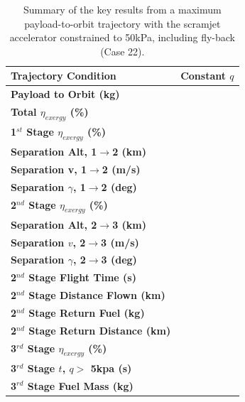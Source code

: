 \begin{table}[!h]
	\centering
\begin{tabular}{l c } 
	\hline \textbf{Trajectory Condition}
	& Constant $q$
	\\
	\hline \textbf{Payload to Orbit (kg)}
	& \textbf{\PayloadToOrbitConstqReturn}
	\\
	\textbf{Total $\eta_{exergy}$ (\%)}
	& \textbf{\totalExergyEffConstqReturn}
	\\
	\hline 
	\textbf{1$^{st}$ Stage $\eta_{exergy}$ (\%)}
	& \textbf{\firstExergyEffConstqReturn}
	\\
	\textbf{Separation Alt, 1$\rightarrow$2 (km)}
	& \firstsecondSeparationAltConstqReturn
	\\
	\textbf{Separation v, 1$\rightarrow$2 (m/s)}
	& \firstsecondSeparationvConstqReturn
	\\
	\textbf{Separation $\gamma$, 1$\rightarrow$2 (deg)}
	& \firstsecondSeparationgammaConstqReturn
	\\
	\hline 
	\textbf{2$^{nd}$ Stage $\eta_{exergy}$ (\%)}
	& \textbf{\secondExergyEffConstqReturn}
	\\
	\textbf{Separation Alt, 2$\rightarrow$3 (km)}
	& \secondthirdSeparationAltConstqReturn
	\\
	\textbf{Separation $v$, 2$\rightarrow$3 (m/s)}
	& \secondthirdSeparationvConstqReturn
	\\
	\textbf{Separation $\gamma$, 2$\rightarrow$3 (deg)}
	& \secondthirdSeparationgammaConstqReturn
	\\
	\textbf{2$^{nd}$ Stage Flight Time (s)}
	& \secondFlightTimeConstqReturn
	\\
	\textbf{2$^{nd}$ Stage Distance Flown (km)}
	& \SecondDistConstqReturn
	\\
	\textbf{2$^{nd}$ Stage Return Fuel (kg)}
	& \returnFuelConstqReturn
	\\
	\textbf{2$^{nd}$ Stage Return Distance (km)}
	& \returnDistConstqReturn
	\\
	\hline 
	\textbf{3$^{rd}$ Stage $\eta_{exergy}$ (\%)}
	& \textbf{\thirddExergyEffConstqReturn}
	\\
	\textbf{3$^{rd}$ Stage $t$, $q >$ 5kpa (s)}
	& \thirdqOverFiveConstqReturn
	\\
	\textbf{3$^{rd}$ Stage Fuel Mass (kg)}
	& \thirdmFuelConstqReturn
	\\
	\hline 
\end{tabular} 
\caption{Summary of the key results from a maximum payload-to-orbit trajectory with the scramjet accelerator constrained to 50kPa, including fly-back (Case 22).}
\end{table}
\FloatBarrier
